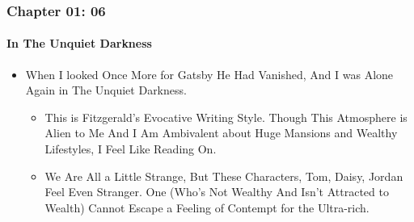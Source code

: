 \begin{frame}
\frametitle{Chapter 01: 06}
\framesubtitle{In The \alert{Unquiet} Darkness}
\label{slide:chapter-01-05}
\begin{itemize}
\pause \item When I looked Once More for Gatsby He Had Vanished, And I was Alone Again in \alert{The Unquiet Darkness}.
\begin{itemize}
\pause \item This is Fitzgerald's \alert{Evocative Writing Style}. Though This Atmosphere is Alien to Me And I Am Ambivalent about Huge Mansions and Wealthy Lifestyles, I Feel Like Reading On.
\pause \item We Are All a Little Strange, But These Characters, Tom, Daisy, Jordan Feel Even Stranger. One (Who's Not Wealthy And Isn't Attracted to Wealth) Cannot Escape a Feeling of Contempt for the Ultra-rich.
\end{itemize}
\end{itemize}
\end{frame}
